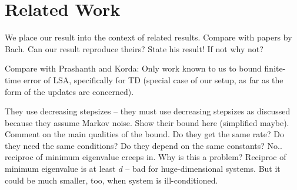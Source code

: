 \section{Related Work}
\label{sec:related}
We place our result into the context of related results.
Compare with papers by Bach. Can our result reproduce theirs?
State his result!
If not why not? 

Compare with Prashanth and Korda:
Only work known to us to bound finite-time error of LSA,
specifically for TD (special case of our setup,
as far as the form of the updates are concerned).

They use decreasing stepsizes -- they must use decreasing stepsizes
as discussed because they assume Markov noise.
Show their bound here (simplified maybe).
Comment on the main qualities of the bound.
Do they get the same rate?
Do they need the same conditions?
Do they depend on the same constants? No.. reciproc of minimum eigenvalue creeps in.
Why is this a problem? Reciproc of minimum eigenvalue is at least $d$ -- bad for huge-dimensional systems.
But it could be much smaller, too, when system is ill-conditioned.
